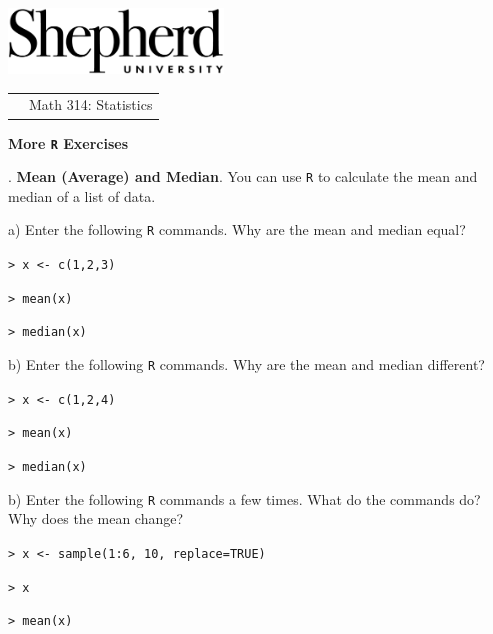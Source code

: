 \documentclass[10pt]{article}
\newcounter{EX}\setcounter{EX}{1}
\newcommand{\EXERCISE}{\arabic{EX}.\stepcounter{EX} }
\begin{document}
\pagestyle{empty}
\lstset{language=R, showspaces=false, showstringspaces=false}

\href{http://www.shepherd.edu}{\includegraphics[height=1.75cm]{logo-high-res.eps}}
\vspace{-1.69cm}

{\small \hfill
\begin{tabular}{cl}
& Math 314: Statistics\\
\end{tabular}
}
\setlength{\baselineskip}{1.05\baselineskip}

\begin{center}
\textbf{\large  More \texttt{R} Exercises}
\end{center}

\newcommand{\SUBX}{\hspace{10pt}}
\newcommand{\HX}{\hspace{10pt}}
\newcommand{\BSK}{\vspace{.14in}}

\EXERCISE \textbf{Mean (Average) and Median}.
You can use \texttt{R} to calculate the mean and median of a list of data.

\HX a) Enter the following \texttt{R} commands.  Why are the mean and median equal?

\HX\HX  \texttt{>  x <- c(1,2,3)}

\HX\HX  \texttt{>  mean(x)}

\HX\HX  \texttt{>  median(x)}
\smallskip

\HX b) Enter the following \texttt{R} commands.  Why are the mean and median different?

\HX\HX  \texttt{>  x <- c(1,2,4)}

\HX\HX  \texttt{>  mean(x)}

\HX\HX  \texttt{>  median(x)}
\smallskip

\HX b) Enter the following \texttt{R} commands a few times.   What do the commands do?
 Why does the mean change?

\HX\HX \texttt{>  x <- sample(1:6, 10, replace=TRUE)}

\HX\HX \texttt{>  x}

\HX\HX \texttt{>  mean(x)}
\smallskip
\end{document}
